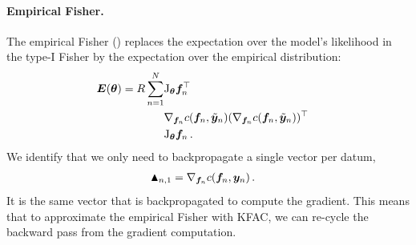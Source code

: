 \paragraph{Empirical Fisher.}
The empirical Fisher () replaces the expectation over the model's likelihood in the type-I Fisher by the expectation over the empirical distribution:
\begin{align*}
  &\begin{aligned}{\bm{E}}({\bm{\theta}}) = R \sum_{n=1}^N
    &\mathrm{J}_{{\bm{\theta}}} {\bm{f}}_n^{\top} \\
                               & \nabla_{{\bm{f}}_n} c({\bm{f}}_n, \tilde{{\bm{y}}}_{n}) (\nabla_{{\bm{f}}_n} c({\bm{f}}_n, \tilde{{\bm{y}}}_n ))^{\top} \\
                               &\mathrm{J}_{{\bm{\theta}}} {\bm{f}}_n\,.
  \end{aligned}
\end{align*}
We identify that we only need to backpropagate a single vector per datum,
\begin{align*}
  \blacktriangle_{n,1}
  &= \nabla_{{\bm{f}}_n}  c({\bm{f}}_n, {\bm{y}}_n)\,.
\end{align*}
It is the same vector that is backpropagated to compute the gradient.
This means that to approximate the empirical Fisher with KFAC, we can re-cycle the backward pass from the gradient computation.

